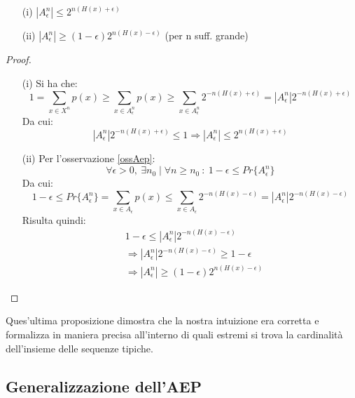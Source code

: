 \begin{proposizione}
 \mbox{}
 \begin{itemize}
  \item[(i)] $ |A_{\epsilon}^n| \le 2^{n(H(x)+\epsilon)}$
 
  \item[(ii)] $|A_{\epsilon}^n| \ge (1-\epsilon) 2^{n(H(x)-\epsilon)}$  (per n suff. grande)
 \end{itemize}
 \begin{proof}
  \mbox{}
  \begin{itemize}
   \item[(i)] Si ha che:
   \[
    1=\sum_{x \in X^n} p(x) \ge \sum_{x \in A_{\epsilon}^n} p(x) \ge 
      \sum_{x \in A_{\epsilon}^n} 2^{-n(H(x)+ \epsilon)}=|A_{\epsilon}^n| 2^{-n(H(x)+ \epsilon)} 
   \]
   Da cui:
   \[
    |A_{\epsilon}^n| 2^{-n(H(x)+ \epsilon)} \le 1 \Rightarrow |A_{\epsilon}^n| \le 2^{n(H(x)+ \epsilon)}
   \]


   \item[(ii)]
   Per l'osservazione \ref{ossAep}:
   \[
    \forall \epsilon > 0, \ \exists n_0 \mid \forall n \ge n_0 \ : \ 1 - \epsilon \le Pr\{A_{\epsilon}^n\}
   \]
   Da cui:
   \[
    1 - \epsilon \le Pr\{A_{\epsilon}^n\}=\sum_{x \in A_{\epsilon}} p(x) \le 
    \sum_{x \in A_{\epsilon}} 2^{-n(H(x)-\epsilon)} = |A_{\epsilon}^n| 2^{-n(H(x)-\epsilon)}
   \]
   Risulta quindi:
   \[\begin{split}
    & 1 - \epsilon \le |A_{\epsilon}^n| 2^{-n(H(x)-\epsilon)}  \\
    & \Rightarrow |A_{\epsilon}^n| 2^{-n(H(x)-\epsilon)}  \ge 1 - \epsilon \\
    &\Rightarrow |A_{\epsilon}^n| \ge (1 - \epsilon) 2^{n(H(x)-\epsilon)}
    \end{split}
   \]

  \end{itemize}

 \end{proof}

\end{proposizione}

Ques'ultima proposizione dimostra che la nostra intuizione era corretta e formalizza in maniera precisa all'interno 
di quali estremi si trova la cardinalità dell'insieme delle sequenze tipiche.

\subsection{Generalizzazione dell'AEP}

